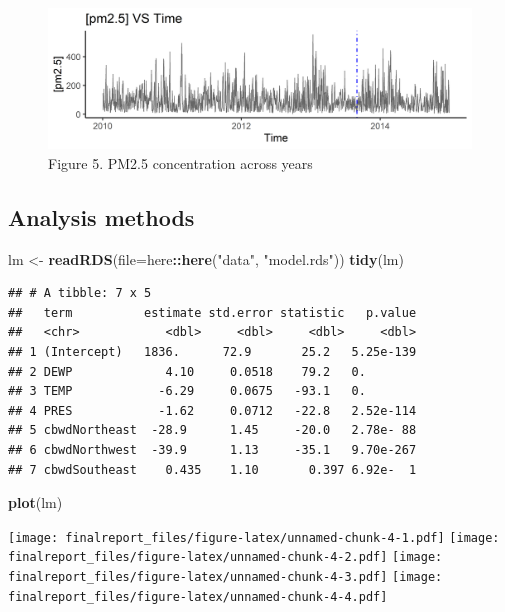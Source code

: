\documentclass[]{article}
\newenvironment{Shaded}{\begin{snugshade}}{\end{snugshade}}
\newcommand{\DataTypeTok}[1]{\textcolor[rgb]{0.13,0.29,0.53}{#1}}
\newcommand{\KeywordTok}[1]{\textcolor[rgb]{0.13,0.29,0.53}{\textbf{#1}}}
\newcommand{\NormalTok}[1]{#1}
\newcommand{\OperatorTok}[1]{\textcolor[rgb]{0.81,0.36,0.00}{\textbf{#1}}}
\newcommand{\StringTok}[1]{\textcolor[rgb]{0.31,0.60,0.02}{#1}}
\begin{document}
\begin{figure}
\centering
\includegraphics{../images/year_PM2.5.png}
\caption{Figure 5. PM2.5 concentration across years}
\end{figure}

\hypertarget{analysis-methods}{%
\subsection{Analysis methods}\label{analysis-methods}}

\begin{Shaded}
\begin{Highlighting}[]
\NormalTok{lm <-}\StringTok{ }\KeywordTok{readRDS}\NormalTok{(}\DataTypeTok{file=}\NormalTok{here}\OperatorTok{::}\KeywordTok{here}\NormalTok{(}\StringTok{"data"}\NormalTok{, }\StringTok{"model.rds"}\NormalTok{))}
\KeywordTok{tidy}\NormalTok{(lm)}
\end{Highlighting}
\end{Shaded}

\begin{verbatim}
## # A tibble: 7 x 5
##   term          estimate std.error statistic   p.value
##   <chr>            <dbl>     <dbl>     <dbl>     <dbl>
## 1 (Intercept)   1836.      72.9       25.2   5.25e-139
## 2 DEWP             4.10     0.0518    79.2   0.       
## 3 TEMP            -6.29     0.0675   -93.1   0.       
## 4 PRES            -1.62     0.0712   -22.8   2.52e-114
## 5 cbwdNortheast  -28.9      1.45     -20.0   2.78e- 88
## 6 cbwdNorthwest  -39.9      1.13     -35.1   9.70e-267
## 7 cbwdSoutheast    0.435    1.10       0.397 6.92e-  1
\end{verbatim}

\begin{Shaded}
\begin{Highlighting}[]
\KeywordTok{plot}\NormalTok{(lm)}
\end{Highlighting}
\end{Shaded}

\texttt{[image: finalreport\_files/figure-latex/unnamed-chunk-4-1.pdf]}
\texttt{[image: finalreport\_files/figure-latex/unnamed-chunk-4-2.pdf]}
\texttt{[image: finalreport\_files/figure-latex/unnamed-chunk-4-3.pdf]}
\texttt{[image: finalreport\_files/figure-latex/unnamed-chunk-4-4.pdf]}
\end{document}
